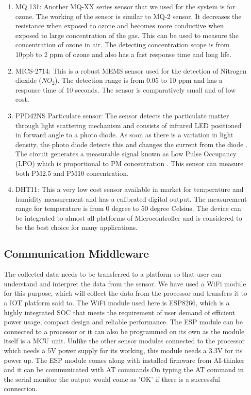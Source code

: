 \begin{enumerate}
\item MQ 131: Another MQ-XX series sensor that we used for the system is for ozone. The working of the sensor is similar to MQ-2 sensor. It decreases the resistance when exposed to ozone and becomes more conductive when exposed to large concentration of the gas. This can be used to measure the concentration of ozone in air. The detecting concentration scope is from 10ppb to 2 ppm of ozone and also has a fast response time and long life.

\item MICS-2714: This is a robust MEMS sensor used for the detection of Nitrogen dioxide ($NO_2$). The detection range is from 0.05 to 10 ppm and has a response time of 10 seconds. The sensor is comparatively small and of low cost.

\item  PPD42NS Particulate sensor: The sensor detects the particulate matter through light scattering mechanism and consists of infrared LED positioned in forward angle to a photo diode. As soon as there is a variation in light density, the photo diode detects this and changes the current from the diode \cite{Allen2002}. The circuit generates a measurable signal known as Low Pulse Occupancy (LPO) which is proportional to PM concentration \cite{Kuula2017}. This sensor can measure both PM2.5 and PM10 concentration.

\item DHT11: This a very low cost sensor available in market for temperature and humidity measurement and has a calibrated digital output. The measurement range for temperature is from 0 degree to 50 degree Celsius. The device can be integrated to almost all platforms of Microcontroller and is considered to be the best choice for many applications.

 \end{enumerate}

 \subsection{Communication Middleware}
 
 The collected data needs to be transferred to a platform so that user can understand and interpret the data from the sensor. We have used a WiFi module for this purpose, which will collect the data from the processor and transfers it to a IOT platform said to. The WiFi module used here is ESP8266, which is a highly integrated SOC that meets the requirement of user demand of efficient power usage, compact design and reliable performance\cite{Systems2018}. The ESP module can be connected to a processor or it can also be programmed on its own as the module itself is a MCU unit. Unlike the other sensor modules connected to the processor which needs a 5V power supply for its working, this module needs a 3.3V for its power up. The ESP module comes along with installed firmware from AI-thinker and it can be communicated with AT commands.On typing the AT command in the serial monitor the output would come as 'OK' if there is a successful connection. 

